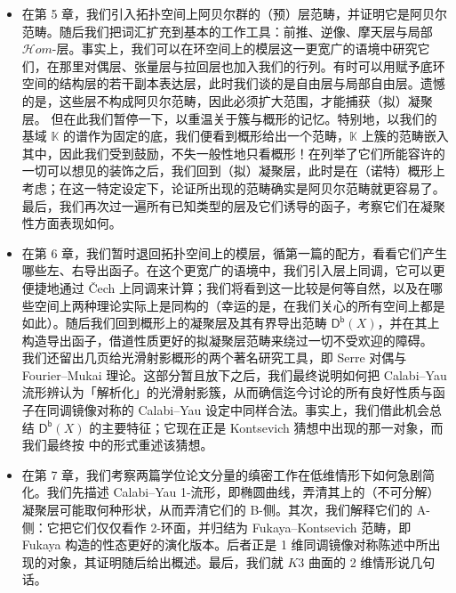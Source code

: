 \begin{itemize}[leftmargin=0.5cm]
\item 在第 5 章，我们引入拓扑空间上阿贝尔群的（预）层范畴，并证明它是阿贝尔范畴。随后我们把词汇扩充到基本的工作工具：前推、逆像、摩天层与局部 $\mathcal{H}om$-层。事实上，我们可以在环空间上的模层这一更宽广的语境中研究它们，在那里对偶层、张量层与拉回层也加入我们的行列。有时可以用赋予底环空间的结构层的若干副本表达层，此时我们谈的是自由层与局部自由层。遗憾的是，这些层不构成阿贝尔范畴，因此必须扩大范围，才能捕获（拟）凝聚层。
\newline 但在此我们暂停一下，以重温关于簇与概形的记忆。特别地，以我们的基域 $\mathbb{K}$ 的谱作为固定的底，我们便看到概形给出一个范畴，$\mathbb{K}$ 上簇的范畴嵌入其中，因此我们受到鼓励，不失一般性地只看概形！在列举了它们所能容许的一切可以想见的装饰之后，我们回到（拟）凝聚层，此时是在（诺特）概形上考虑；在这一特定设定下，论证所出现的范畴确实是阿贝尔范畴就更容易了。最后，我们再次过一遍所有已知类型的层及它们诱导的函子，考察它们在凝聚性方面表现如何。

\item 在第 6 章，我们暂时退回拓扑空间上的模层，循第一篇的配方，看看它们产生哪些左、右导出函子。在这个更宽广的语境中，我们引入层上同调，它可以更便捷地通过 \v{C}ech 上同调来计算；我们将看到这一比较是何等自然，以及在哪些空间上两种理论实际上是同构的（幸运的是，在我们关心的所有空间上都是如此）。随后我们回到概形上的凝聚层及其有界导出范畴 $\mathsf{D^b}(X)$，并在其上构造导出函子，借道性质更好的拟凝聚层范畴来绕过一切不受欢迎的障碍。
\newline 我们还留出几页给光滑射影概形的两个著名研究工具，即 Serre 对偶与 Fourier--Mukai 理论。这部分暂且放下之后，我们最终说明如何把 Calabi--Yau 流形辨认为「解析化」的光滑射影簇，从而确信迄今讨论的所有良好性质与函子在同调镜像对称的 Calabi--Yau 设定中同样合法。事实上，我们借此机会总结 $\mathsf{D^b}(X)$ 的主要特征；它现在正是 Kontsevich 猜想中出现的那一对象，而我们最终按 \cite{[Imp21]} 中的形式重述该猜想。

\item 在第 7 章，我们考察两篇学位论文分量的缜密工作在低维情形下如何急剧简化。我们先描述 Calabi--Yau 1-流形，即椭圆曲线，弄清其上的（不可分解）凝聚层可能取何种形状，从而弄清它们的 B-侧。其次，我们解释它们的 A-侧：它把它们仅仅看作 2-环面，并归结为 Fukaya--Kontsevich 范畴，即 Fukaya 构造的性态更好的演化版本。后者正是 1 维同调镜像对称陈述中所出现的对象，其证明随后给出概述。最后，我们就 $K3$ 曲面的 2 维情形说几句话。
\end{itemize}

